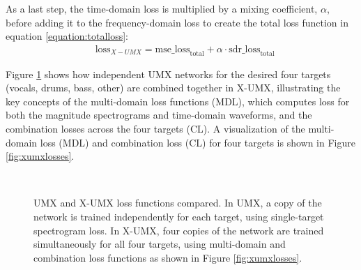 \documentclass[report.tex]{subfiles}
\begin{document}
As a last step, the time-domain loss is multiplied by a mixing coefficient, $\alpha$, before adding it to the frequency-domain loss to create the total loss function in equation \eqref{equation:totalloss}:
\begin{align}\tag{33}\label{equation:totalloss}
	\nonumber & \text{loss}_{X-UMX} = \text{mse\_loss}_{\text{total}} + \alpha \cdot \text{sdr\_loss}_{\text{total}}
\end{align}

Figure \ref{fig:umxandxumx} shows how independent UMX networks for the desired four targets (vocals, drums, bass, other) are combined together in X-UMX, illustrating the key concepts of the multi-domain loss functions (MDL), which computes loss for both the magnitude spectrograms and time-domain waveforms, and the combination losses across the four targets (CL). A visualization of the multi-domain loss (MDL) and combination loss (CL) for four targets is shown in Figure \ref{fig:xumxlosses}.

\begin{figure}[ht]
	\centering
	\\
	\caption{UMX and X-UMX loss functions compared. In UMX, a copy of the network is trained independently for each target, using single-target spectrogram loss. In X-UMX, four copies of the network are trained simultaneously for all four targets, using multi-domain and combination loss functions as shown in Figure \ref{fig:xumxlosses}.}
	\label{fig:umxandxumx}
\end{figure}
\end{document}
